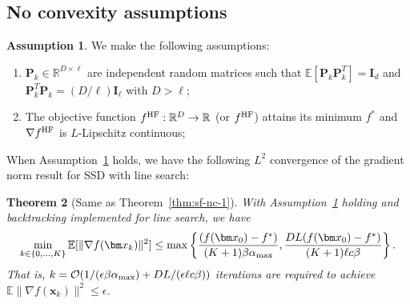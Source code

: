 \documentclass[10pt]{article} %
\numberwithin{equation}{section}
\theoremstyle{plain}
\newtheorem{theorem}{Theorem} \numberwithin{theorem}{section}
\theoremstyle{definition}
\newtheorem{assumption}[theorem]{Assumption}
\newcommand{\<}{\langle}
\renewcommand{\>}{\rangle}
\renewcommand{\(}{\left(}
\renewcommand{\)}{\right)}
\renewcommand{\[}{\left[}
\renewcommand{\]}{\right]}
\def\R{{\mathbb R}}
\def\R{{\mathbb R}}
\newcommand{\HF}{\textup{HF}}
\newcommand{\alphaMax}{\alpha_\textup{max}}
\newcommand{\Lip}{L}
\begin{document}
\subsection{No convexity assumptions} \label{sec:B3}
\begin{assumption}
\label{asp:ssd3}
We make the following assumptions:
\begin{enumerate}
    \item $\bm P_k\in\R^{D\times\ell}$ are independent random matrices such that $\mathbb{E}[\bm P_k\bm P_k^T] = \bm I_d$ and $\bm P_k^T\bm P_k = (D/\ell)\bm I_\ell$ with $D>\ell$;
    \item The objective function $f^\HF:\R^D\to\R$ (or $f^\HF$) attains its minimum $f^*$ and $\nabla f^\HF$ is $\Lip$-Lipschitz continuous;
\end{enumerate}
\end{assumption}
When Assumption~\ref{asp:ssd3} holds, we have the following $L^2$ convergence of the gradient norm result for SSD with line search:
\begin{theorem}[Same as Theorem~\ref{thm:sf-nc-1}]
\label{thm:sf-nc}
With Assumption~\ref{asp:ssd3} holding and backtracking implemented for line search, we have
\begin{equation}
\min_{k\in\{0,\dots,K\}} \mathbb{E}[\lVert\nabla f(\bm x_k)\rVert^2] \leq \max\left\{\frac{(f(\bm x_0) - f^*)}{(K+1)\beta \alphaMax}, \frac{D\Lip (f(\bm x_0) - f^*)}{(K+1)\ell c\beta}\right\}.
\end{equation}
That is, $k=\mathcal{O}(1/(\epsilon\beta \alphaMax)+D\Lip/(\epsilon\ell c\beta))$ iterations are required to achieve $\mathbb{E}\lVert \nabla f(\bm x_k)\rVert^2\leq\epsilon$.
\end{theorem}
\end{document}
